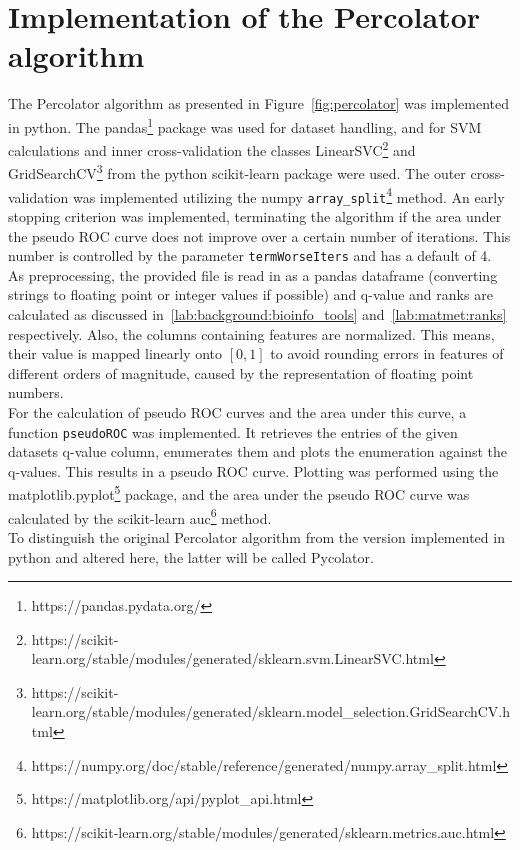 \section{Implementation of the Percolator algorithm}
The Percolator algorithm as presented in Figure~\ref{fig:percolator} was implemented in python. The pandas\footnote{https://pandas.pydata.org/} package was used for dataset handling, and for SVM calculations and inner cross-validation the classes LinearSVC\footnote{https://scikit-learn.org/stable/modules/generated/sklearn.svm.LinearSVC.html} and GridSearchCV\footnote{https://scikit-learn.org/stable/modules/generated/sklearn.model\_selection.GridSearchCV.html} from the python scikit-learn package were used. The outer cross-validation was implemented utilizing the numpy \texttt{array\_split}\footnote{https://numpy.org/doc/stable/reference/generated/numpy.array\_split.html} method. An early stopping criterion was implemented, terminating the algorithm if the area under the pseudo ROC curve does not improve over a certain number of iterations. This number is controlled by the parameter \texttt{termWorseIters} and has a default of 4.\\
\label{lab:matmet:normalization}As preprocessing, the provided file is read in as a pandas dataframe (converting strings to floating point or integer values if possible) and q-value and ranks are calculated as discussed in~\ref{lab:background:bioinfo_tools} and~\ref{lab:matmet:ranks} respectively. Also, the columns containing features are normalized. This means, their value is mapped linearly onto $[0,1]$ to avoid rounding errors in features of different orders of magnitude, caused by the representation of floating point numbers.\\
\label{lab:matmet:pseudoROC}For the calculation of pseudo ROC curves and the area under this curve, a function \texttt{pseudoROC} was implemented. It retrieves the entries of the given datasets q-value column, enumerates them and plots the enumeration against the q-values. This results in a pseudo ROC curve. Plotting was performed using the matplotlib.pyplot\footnote{https://matplotlib.org/api/pyplot\_api.html} package, and the area under the pseudo ROC curve was calculated by the scikit-learn auc\footnote{https://scikit-learn.org/stable/modules/generated/sklearn.metrics.auc.html} method.\\
To distinguish the original Percolator algorithm from the version implemented in python and altered here, the latter will be called Pycolator.

